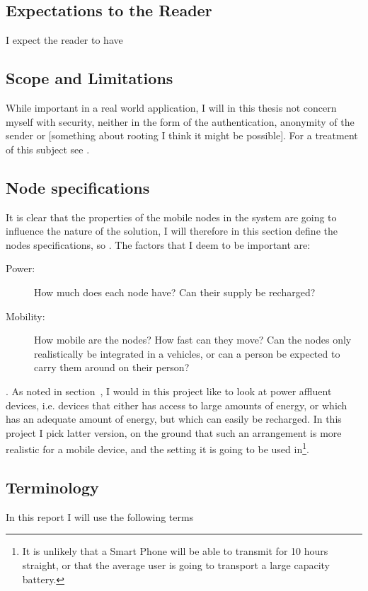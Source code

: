 \subsection{Expectations to the Reader}
I expect the reader to have 

\subsection{Scope and Limitations}
While important in a real world application, I will in this thesis not concern myself with security, neither in the form of the authentication, anonymity of the sender or [something about rooting I think it might be possible]. For a treatment of this subject see \cite{trustedRouting}. 


\subsection{Node specifications}
It is clear that the properties of the mobile nodes in the system are going to influence the nature of the solution, I will therefore in this section define the nodes specifications, so  . The factors that I deem to be important are: 
\begin{description}
\item[Power:] How much does each node have? Can their supply be recharged?
\item[Mobility:] How mobile are the nodes? How fast can they move? Can the nodes only realistically be integrated in a vehicles, or can a person be expected to carry them around on their person?
\item[]
\end{description}

    . As noted in section~, I would in this project like to look at power affluent devices, i.e. devices that either has access to large amounts of energy, or which has an adequate amount of energy, but which can easily be recharged. In this project I pick latter version, on the ground that such an arrangement is more realistic for a mobile device, and the setting it is going to be used in\footnote{It is unlikely that a Smart Phone will be able to transmit for 10 hours straight, or that the average user is going to transport a large capacity battery.}. 

\subsection{Terminology}
\label{Terminology}
In this report I will use the following terms 

